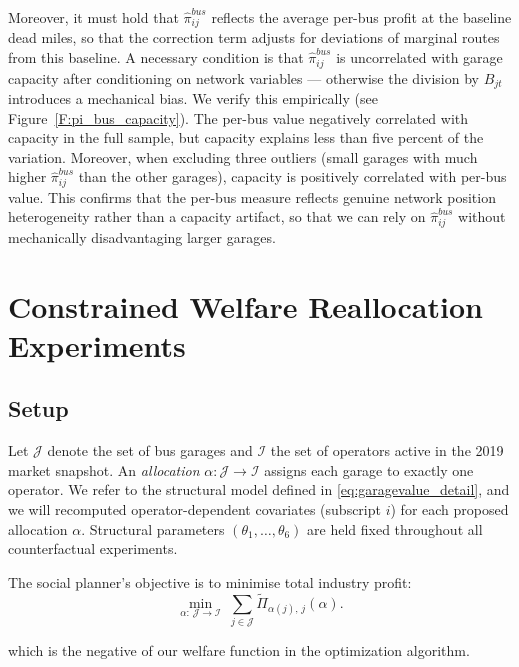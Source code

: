 \documentclass[12pt]{article}
\begin{document}
Moreover, it must hold that 
$\hat{\pi}_{ij}^{bus}$ reflects the average per-bus profit at 
the baseline dead miles, so that the correction term adjusts for deviations 
of marginal routes from this baseline. A necessary condition is that 
$\hat{\pi}_{ij}^{bus}$ is uncorrelated with garage capacity after conditioning 
on network variables — otherwise the division by $B_{jt}$ introduces a 
mechanical bias. We verify this empirically (see Figure~\ref{F:pi_bus_capacity}). The per-bus value  negatively correlated with capacity in the full sample, but capacity explains less than five percent of the variation. Moreover, when excluding three outliers (small garages with much higher $\hat{\pi}_{ij}^{bus}$ than the other garages), capacity is positively correlated with per-bus value. This confirms that the per-bus 
measure reflects genuine network position heterogeneity rather than a 
capacity artifact, so that we can rely on $\hat{\pi}_{ij}^{bus}$ without mechanically disadvantaging larger garages.




\section{Constrained Welfare Reallocation Experiments\label{S:realloc-experiment}}

\subsection{Setup}

Let $\mathcal{J}$ denote the set of bus garages and $\mathcal{I}$ the set of
operators active in the 2019 market snapshot.  An \emph{allocation}
$\alpha: \mathcal{J} \to \mathcal{I}$ assigns each garage to exactly one
operator. We refer to the structural model defined in \eqref{eq:garagevalue_detail}, and we will recomputed operator-dependent covariates (subscript $i$) for
each proposed allocation $\alpha$.  Structural parameters
$(\theta_1,\ldots,\theta_6)$ are held fixed throughout all counterfactual experiments.

The social planner's objective is to minimise total industry profit:
%
\begin{equation}
  \min_{\alpha:\,\mathcal{J}\to\mathcal{I}} \;
  \sum_{j \in \mathcal{J}} \tilde{\Pi}_{\alpha(j),\,j}(\alpha).
  \label{eq:planner}
\end{equation}

which is the negative of our welfare function in the optimization algorithm.
\end{document}
